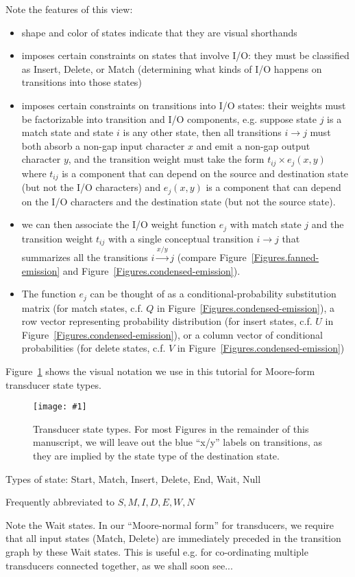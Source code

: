 \documentclass{article}
\newcommand{\figref}[1]{Figure~\ref{Figures.#1}}
\newcommand{\figlabel}[1]{\label{Figures.#1}}
\newcommand{\easyfig}[4]{
\begin{figure}
\texttt{[image: \#1]}
\caption{ \figlabel{#3} #4}
\end{figure}}
\newcommand{\widepdffig}[2]{\easyfig{#1-fig.pdf}{width=\textwidth}{#1}{#2}}
\begin{document}
Note the features of this view:
\begin{itemize}
\item shape and color of states indicate that they are visual shorthands
\item imposes certain constraints on states that involve I/O:
 they must be classified as Insert, Delete, or Match
 (determining what kinds of I/O happens on transitions into those states)
\item imposes certain constraints on transitions into I/O states:
 their weights must be factorizable into transition and I/O components,
 e.g. suppose state $j$ is a match state and state $i$ is any other state,
 then all transitions $i \to j$ must both absorb a non-gap input character $x$
 and emit a non-gap output character $y$,
 and the transition weight must take the form $t_{ij} \times e_j(x,y)$
 where $t_{ij}$ is a component that can depend on the source and destination state
  (but not the I/O characters)
 and $e_j(x,y)$ is a component that can depend on the I/O characters and the destination state
  (but not the source state).
\item we can then associate the I/O weight function $e_j$ with match state $j$
 and the transition weight $t_{ij}$ with a single conceptual transition $i \to j$
 that summarizes all the transitions $i \stackrel{x/y}{\to} j$
 (compare \figref{fanned-emission} and \figref{condensed-emission}).
\item The function $e_j$ can be thought of as a conditional-probability substitution matrix
 (for match states, c.f. $Q$ in \figref{condensed-emission}),
a row vector representing probability distribution
 (for insert states, c.f. $U$ in \figref{condensed-emission}),
or a column vector of conditional probabilities
 (for delete states, c.f. $V$ in \figref{condensed-emission})
\end{itemize}

\figref{legend} shows the visual notation we use in this tutorial for Moore-form transducer state types.
\widepdffig{legend}{Transducer state types.
For most Figures in the remainder of this manuscript, we will leave out the blue ``x/y'' labels on transitions,
as they are implied by the state type of the destination state.
}

Types of state: Start, Match, Insert, Delete, End, Wait, Null

Frequently abbreviated to $S,M,I,D,E,W,N$

Note the Wait states.
In our ``Moore-normal form'' for transducers, we require that all input states (Match, Delete)
are immediately preceded in the transition graph by these Wait states.
This is useful e.g. for co-ordinating multiple transducers connected together, as we shall soon see...
\end{document}

